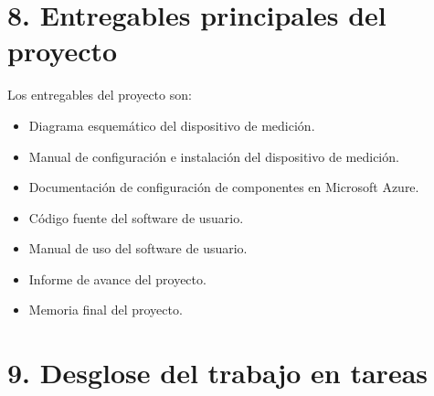 \documentclass[
11pt, %
]{charter}
\begin{document}
\section{8. Entregables principales del proyecto}
\label{sec:entregables}


Los entregables del proyecto son:

\begin{itemize}
	\item Diagrama esquemático del dispositivo de medición.
	\item Manual de configuración e instalación del dispositivo de medición.
	\item Documentación de configuración de componentes en Microsoft Azure.
	\item Código fuente del software de usuario.
	\item Manual de uso del software de usuario.
	\item Informe de avance del proyecto.
	\item Memoria final del proyecto.
\end{itemize}


\section{9. Desglose del trabajo en tareas}
\label{sec:wbs}
\end{document}
